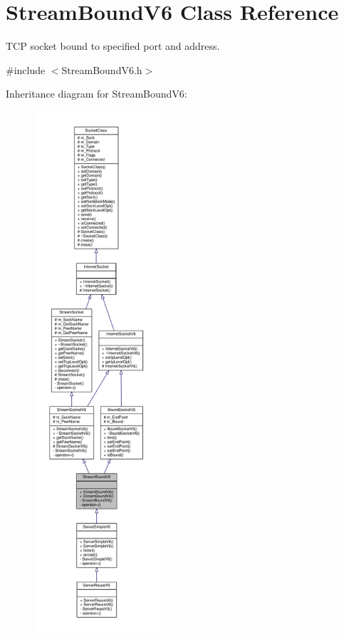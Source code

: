 \hypertarget{classStreamBoundV6}{}\section{Stream\+Bound\+V6 Class Reference}
\label{classStreamBoundV6}


T\+CP socket bound to specified port and address.  




{\ttfamily \#include $<$Stream\+Bound\+V6.\+h$>$}



Inheritance diagram for Stream\+Bound\+V6\+:\nopagebreak
\begin{figure}[H]
\begin{center}
\leavevmode
\includegraphics[height=550pt]{classStreamBoundV6__inherit__graph}
\end{center}
\end{figure}
